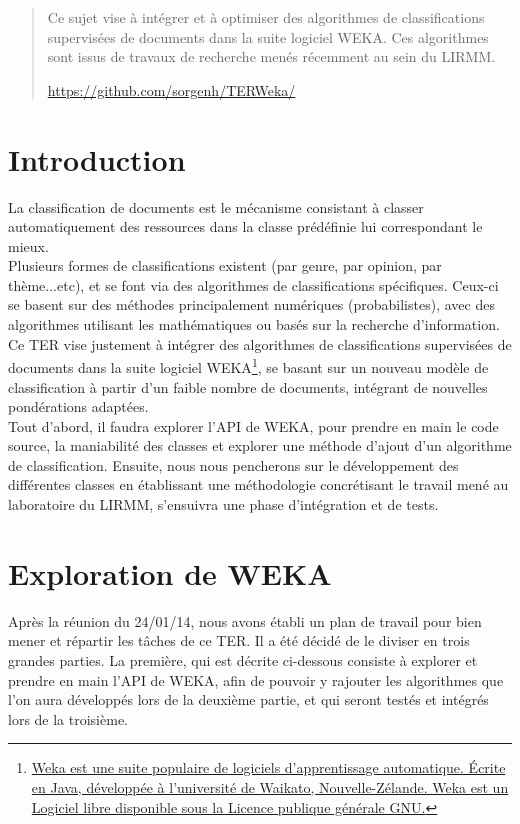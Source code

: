 \documentclass{article}
\begin{document}
\begin{abstract}
	
Ce sujet vise à intégrer et à optimiser des algorithmes de classifications supervisées de documents dans la suite logiciel WEKA. Ces algorithmes sont issus de travaux de recherche menés récemment au sein du LIRMM.
\begin{center}
\href{https://github.com/sorgenh/TERWeka/}{https://github.com/sorgenh/TERWeka/}
\end{center}
\end{abstract}

\newpage 
\section{Introduction}\label{sec:intro}
La classification de documents est le mécanisme consistant à classer automatiquement des ressources dans la classe prédéfinie lui correspondant le mieux.\\
Plusieurs formes de classifications existent (par genre, par opinion, par thème...etc), et se font via des algorithmes de classifications spécifiques. Ceux-ci se basent sur des méthodes principalement numériques (probabilistes), avec des algorithmes utilisant les mathématiques ou basés sur la recherche d'information. \\
Ce TER vise justement à intégrer des algorithmes de classifications supervisées de documents dans la suite logiciel WEKA\footnote{\href{http://www.cs.waikato.ac.nz/~ml/weka/}{Weka est une suite populaire de logiciels d'apprentissage automatique. Écrite en Java, développée à l'université de Waikato, Nouvelle-Zélande. Weka est un Logiciel libre disponible sous la Licence publique générale GNU.}}, se basant sur un nouveau modèle de classification à partir d'un faible nombre de documents, intégrant de nouvelles pondérations adaptées.\\
Tout d'abord, il faudra explorer l'API de WEKA, pour prendre en main le code source, la maniabilité des classes et explorer une méthode d'ajout d'un algorithme de classification. Ensuite, nous nous pencherons sur le développement des différentes classes en établissant une méthodologie concrétisant le travail mené au laboratoire du LIRMM, s'ensuivra une phase d'intégration et de tests.



\section{Exploration de WEKA}
Après la réunion du 24/01/14, nous avons établi un plan de travail pour bien mener et répartir les tâches de ce TER. Il a été décidé de le diviser en trois grandes parties. La première, qui est décrite ci-dessous consiste à explorer et prendre en main l'API de WEKA, afin de pouvoir y rajouter les algorithmes que l'on aura développés lors de la deuxième partie, et qui seront testés et intégrés lors de la troisième.
\end{document}
